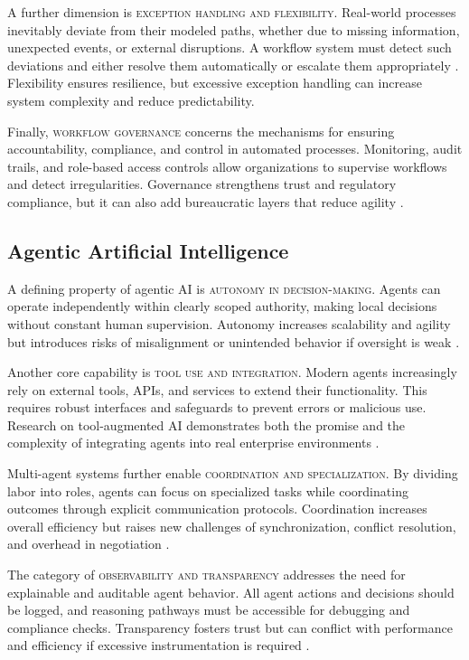 A further dimension is \textsc{exception handling and flexibility}. Real-world processes inevitably deviate from their modeled paths, whether due to missing information, unexpected events, or external disruptions. A workflow system must detect such deviations and either resolve them automatically or escalate them appropriately \parencite{basuResearch2002}. Flexibility ensures resilience, but excessive exception handling can increase system complexity and reduce predictability.

Finally, \textsc{workflow governance} concerns the mechanisms for ensuring accountability, compliance, and control in automated processes. Monitoring, audit trails, and role-based access controls allow organizations to supervise workflows and detect irregularities. Governance strengthens trust and regulatory compliance, but it can also add bureaucratic layers that reduce agility \parencite{owoadeSystematic2024}.

\subsection{Agentic Artificial Intelligence}\label{subsec:agentic-ai}
A defining property of agentic AI is \textsc{autonomy in decision-making}. Agents can operate independently within clearly scoped authority, making local decisions without constant human supervision. Autonomy increases scalability and agility but introduces risks of misalignment or unintended behavior if oversight is weak \parencite{shapiroFoundations2023}.

Another core capability is \textsc{tool use and integration}. Modern agents increasingly rely on external tools, APIs, and services to extend their functionality. This requires robust interfaces and safeguards to prevent errors or malicious use. Research on tool-augmented AI demonstrates both the promise and the complexity of integrating agents into real enterprise environments \parencite{schickToolformer2023}.

Multi-agent systems further enable \textsc{coordination and specialization}. By dividing labor into roles, agents can focus on specialized tasks while coordinating outcomes through explicit communication protocols. Coordination increases overall efficiency but raises new challenges of synchronization, conflict resolution, and overhead in negotiation \parencite{wooldridgeIntroduction2009}.

The category of \textsc{observability and transparency} addresses the need for explainable and auditable agent behavior. All agent actions and decisions should be logged, and reasoning pathways must be accessible for debugging and compliance checks. Transparency fosters trust but can conflict with performance and efficiency if excessive instrumentation is required \parencite{owoadeSystematic2024}.

